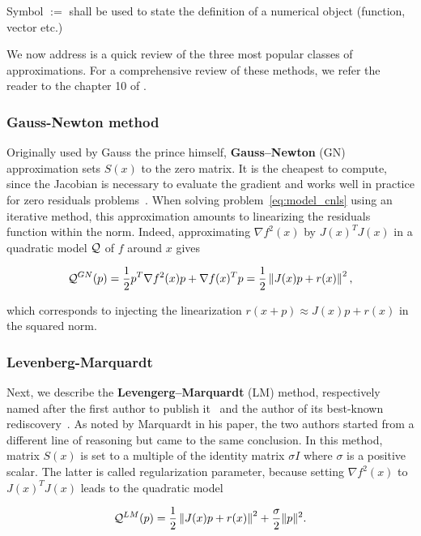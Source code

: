 \documentclass[10pt]{article}
\numberwithin{equation}{section}
\begin{document}
	 Symbol $:=$ shall be used to state the definition of a numerical object (function, vector etc.)
	 
	 We now address is a quick review of the three most popular classes of approximations. For a comprehensive review of these methods, we refer the reader to the chapter 10 of \cite{dennisschnabel:1996}.
	 
	 \subsubsection{Gauss-Newton method}
	 
	 Originally used by Gauss the prince himself, \textbf{Gauss--Newton} (GN) approximation sets $S(x)$ to the zero matrix. It is the cheapest to compute, since the Jacobian is necessary to evaluate the gradient and works well in practice for zero residuals problems~\cite{dennisschnabel:1996}. When solving problem~\eqref{eq:model_cnls} using an iterative method, this approximation amounts to linearizing the residuals function within the norm. Indeed, approximating $\nabla f^2(x)$ by $J(x)^TJ(x)$ in a quadratic model ${\mathcal{Q}}$ of $f$ around $x$ gives
	 
	 \begin{equation}\label{eq:gn_model}
	 	{\mathcal{Q}}^{GN} (p) = \dfrac{1}{2}p^T\nabla f^2(x)p + \nabla f(x)^Tp =  \dfrac{1}{2} \left\Vert J(x)p+r(x) \right\Vert^2,
	 \end{equation}
	 
	 which corresponds to injecting the linearization $r(x+p) \approx J(x)p+r(x)$ in the squared norm.
	 
	 \subsubsection{Levenberg-Marquardt}
	 
	 Next, we describe the \textbf{Levengerg--Marquardt} (LM) method, respectively named after the first author to publish it~\cite{levenberg:1944} and the author of its best-known rediscovery~\cite{marquardt:1963}. As noted by Marquardt in his paper, the two authors started from a different line of reasoning but came to the same conclusion. In this method, matrix $S(x)$ is set to a multiple of the identity matrix $\sigma I$ where $\sigma$ is a positive scalar. The latter is called regularization parameter, because setting  $\nabla f^2(x)$ to $J(x)^TJ(x)$ leads to the quadratic model 
	 
	 \begin{equation}\label{eq:lm_model}
	 	{\mathcal{Q}}^{LM}(p) =  \dfrac{1}{2} \left\Vert J(x)p+r(x) \right\Vert^2 + \dfrac{\sigma}{2} \|p\|^2.
	 \end{equation}
	 
\end{document}
